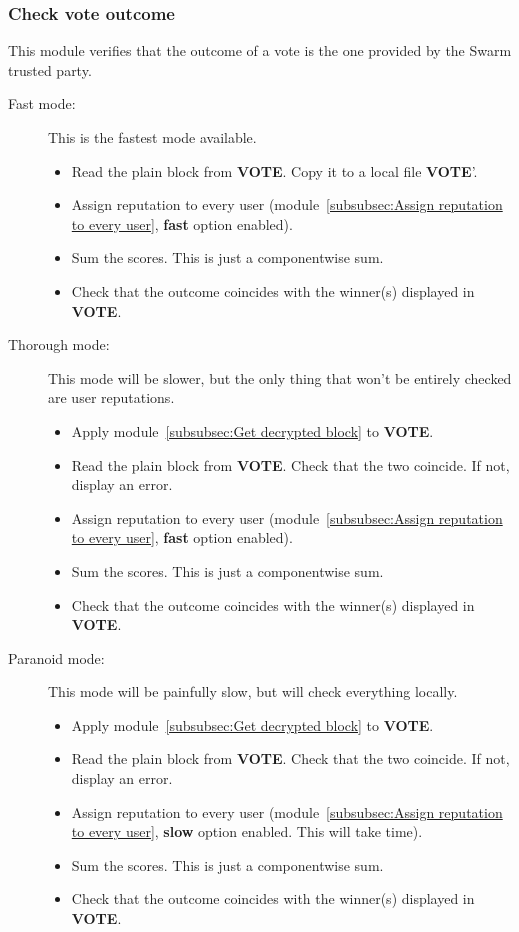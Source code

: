 \documentclass[submission, copyright,creativecommons,sharealike,noncommercial]{eptcs}
\newcommand{\Vote}{\textbf{VOTE}\xspace}
\begin{document}
\subsubsection{Check vote outcome}\label{subsubsec:Calculate vote outcome}
This module verifies that the outcome of a vote is the one provided by the Swarm trusted party.
	\begin{description}
		\item[Fast mode:] This is the fastest mode available. 
			\begin{itemize}
				\item Read the plain block from \Vote. Copy it to a local file \Vote'.
				\item Assign reputation to every user (module~\ref{subsubsec:Assign reputation to every user}, \textbf{fast} option enabled).
				\item Sum the scores. This is just a componentwise sum.
				\item Check that the outcome coincides with the winner(s) displayed in \Vote.
			\end{itemize}	
		\item[Thorough mode:] This mode will be slower, but the only thing that won't be entirely checked are user reputations.
			\begin{itemize}
				\item Apply module~\ref{subsubsec:Get decrypted block} to \Vote.
				\item Read the plain block from \Vote. Check that the two coincide. If not, display an error.
				\item Assign reputation to every user (module~\ref{subsubsec:Assign reputation to every user}, \textbf{fast} option enabled).
				\item Sum the scores. This is just a componentwise sum.
				\item Check that the outcome coincides with the winner(s) displayed in \Vote.
			\end{itemize}			
		\item[Paranoid mode:] This mode will be painfully slow, but will check everything locally.
			\begin{itemize}
				\item Apply module~\ref{subsubsec:Get decrypted block} to \Vote.
				\item Read the plain block from \Vote. Check that the two coincide. If not, display an error.
				\item Assign reputation to every user (module~\ref{subsubsec:Assign reputation to every user}, \textbf{slow} option enabled. This will take time).
				\item Sum the scores. This is just a componentwise sum.
				\item Check that the outcome coincides with the winner(s) displayed in \Vote.
			\end{itemize}			
	\end{description}
\end{document}
